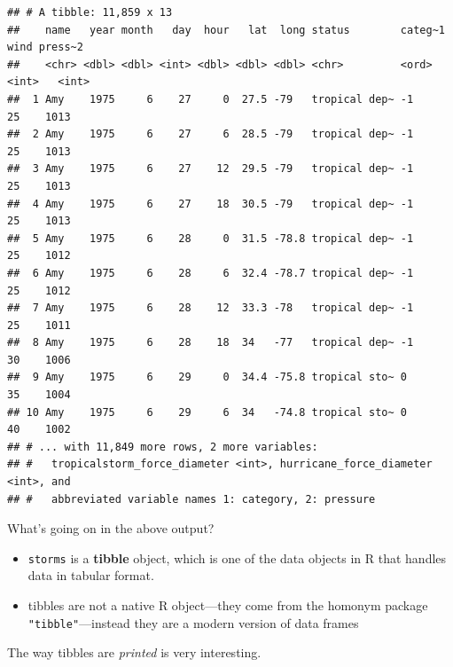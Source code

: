 \documentclass[
]{book}
\begin{document}
\begin{verbatim}
## # A tibble: 11,859 x 13
##    name   year month   day  hour   lat  long status        categ~1  wind press~2
##    <chr> <dbl> <dbl> <int> <dbl> <dbl> <dbl> <chr>         <ord>   <int>   <int>
##  1 Amy    1975     6    27     0  27.5 -79   tropical dep~ -1         25    1013
##  2 Amy    1975     6    27     6  28.5 -79   tropical dep~ -1         25    1013
##  3 Amy    1975     6    27    12  29.5 -79   tropical dep~ -1         25    1013
##  4 Amy    1975     6    27    18  30.5 -79   tropical dep~ -1         25    1013
##  5 Amy    1975     6    28     0  31.5 -78.8 tropical dep~ -1         25    1012
##  6 Amy    1975     6    28     6  32.4 -78.7 tropical dep~ -1         25    1012
##  7 Amy    1975     6    28    12  33.3 -78   tropical dep~ -1         25    1011
##  8 Amy    1975     6    28    18  34   -77   tropical dep~ -1         30    1006
##  9 Amy    1975     6    29     0  34.4 -75.8 tropical sto~ 0          35    1004
## 10 Amy    1975     6    29     6  34   -74.8 tropical sto~ 0          40    1002
## # ... with 11,849 more rows, 2 more variables:
## #   tropicalstorm_force_diameter <int>, hurricane_force_diameter <int>, and
## #   abbreviated variable names 1: category, 2: pressure
\end{verbatim}

What's going on in the above output?

\begin{itemize}
\item
  \texttt{storms} is a \textbf{tibble} object, which is one of the data objects in R that
  handles data in tabular format.
\item
  tibbles are not a native R object---they come from the homonym package
  \texttt{"tibble"}---instead they are a modern version of data frames
\end{itemize}

The way tibbles are \emph{printed} is very interesting.
\end{document}
